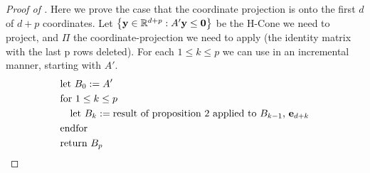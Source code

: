 \begin{proof}[Proof of ]
	Here we prove the case that the coordinate projection is onto the first $d$ of $d+p$ coordinates.  Let $\left\{\mathbf{y}\in\mathbb{R}^{d+p}:A'\mathbf{y} \leq \mathbf{0}\right\}$ be the H-Cone we need to project, and $\Pi$ the coordinate-projection we need to apply (the identity matrix with the last p rows deleted).  For each $1 \leq k \leq p$ we can use  in an incremental manner, starting with $A'$.
	\begin{align*}
		 & \text{let } B_0 := A'                                        \\
		 & \text{for } 1 \leq k \leq p                                  \\
		 & \quad \text{let } B_k :=
		\text{result of proposition 2 applied to $B_{k-1}$, $\mathbf{e}_{d+k}$} \\
		 & \text{endfor}                                                \\
		 & \text{return } B_p
	\end{align*}


\end{proof}
